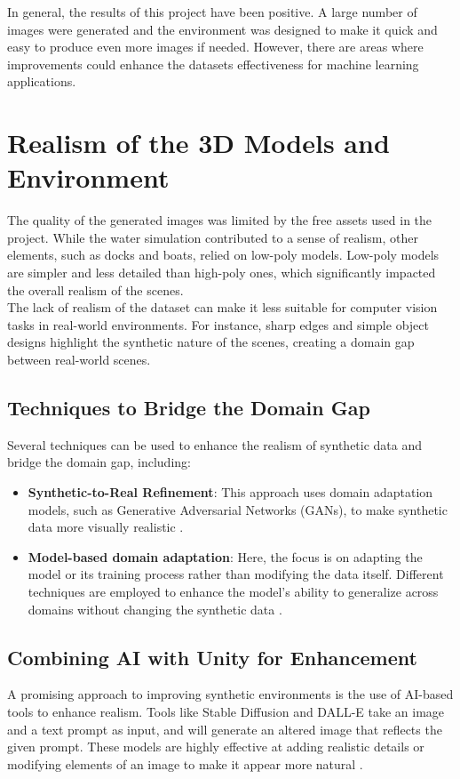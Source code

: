 
In general, the results of this project have been positive. A large number of images were generated and the environment was designed to make it quick and easy to produce even more images if needed. However, there are areas where improvements could enhance the datasets effectiveness for machine learning applications.

\section{Realism of the 3D Models and Environment}
The quality of the generated images was limited by the free assets used in the project. While the water simulation contributed to a sense of realism, other elements, such as docks and boats, relied on low-poly models. Low-poly models are simpler and less detailed than high-poly ones, which significantly impacted the overall realism of the scenes. \\

\noindent The lack of realism of the dataset can make it less suitable for computer vision tasks in real-world environments. For instance, sharp edges and simple object designs highlight the synthetic nature of the scenes, creating a domain gap between real-world scenes.

\subsection{Techniques to Bridge the Domain Gap}
Several techniques can be used to enhance the realism of synthetic data and bridge the domain gap, including:

\begin{itemize}
    \item \textbf{Synthetic-to-Real Refinement}: This approach uses domain adaptation models, such as Generative Adversarial Networks (GANs), to make synthetic data more visually realistic \cite{nikolenko2021synthetic}.

    \item \textbf{Model-based domain adaptation}: Here, the focus is on adapting the model or its training process rather than modifying the data itself. Different techniques are employed to enhance the model's ability to generalize across domains without changing the synthetic data \cite{nikolenko2021synthetic}.
\end{itemize}


\subsection{Combining AI with Unity for Enhancement}
A promising approach to improving synthetic environments is the use of AI-based tools to enhance realism. Tools like Stable Diffusion and DALL-E take an image and a text prompt as input, and will generate an altered image that reflects the given prompt. These models are highly effective at adding realistic details or modifying elements of an image to make it appear more natural \cite{aiToExoand}. \\

